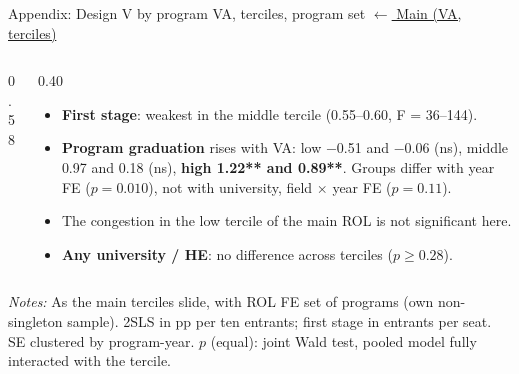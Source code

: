 \documentclass{beamer}
\begin{document}
\begin{frame}[label=d5-app-va-terciles-set]{Appendix: Design V by program VA, terciles, program set}
\vspace{-0.3cm}
\hyperlink{d5-va-terciles}{\tiny\color{blue}$\leftarrow$ Main (VA, terciles)}

\begin{columns}[T,onlytextwidth]
\begin{column}{0.58\textwidth}
\centering
\tiny
\resizebox{\linewidth}{!}{}
\end{column}
\begin{column}{0.40\textwidth}
\scriptsize
\begin{itemize}
    \setlength{\itemsep}{3pt}
    \item \textbf{First stage}: weakest in the middle tercile (0.55--0.60, F = 36--144).
    \item \textbf{Program graduation} rises with VA: low $-$0.51 and $-$0.06 (ns), middle 0.97 and 0.18 (ns), \textbf{high 1.22** and 0.89**}. Groups differ with year FE ($p=0.010$), not with university, field $\times$ year FE ($p=0.11$).
    \item The congestion in the low tercile of the main ROL is not significant here.
    \item \textbf{Any university / HE}: no difference across terciles ($p\geq0.28$).
\end{itemize}
\end{column}
\end{columns}

\vspace{0.05cm}
\parbox{0.97\textwidth}{\tiny \textit{Notes:} As the main terciles slide, with ROL FE set of programs (own non-singleton sample). 2SLS in pp per ten entrants; first stage in entrants per seat. SE clustered by program-year. $p$ (equal): joint Wald test, pooled model fully interacted with the tercile.}
\end{frame}
\end{document}
